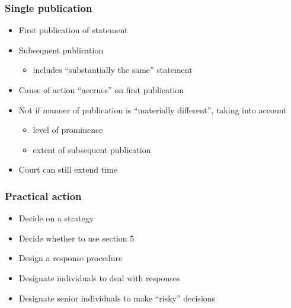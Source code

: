 \documentclass[ignorenonframetext,]{beamer}
\begin{document}
\begin{frame}
  \frametitle{Single publication}
  \begin{itemize}
  \item First publication of statement
  \item Subsequent publication
    \begin{itemize}
    \item includes ``substantially the same'' statement
    \end{itemize}
  \item Cause of action ``accrues'' on first publication
  \item Not if manner of publication is ``materially different'', taking into account
    \begin{itemize}
    \item level of prominence
    \item extent of subsequent publication
    \end{itemize}
  \item Court can still extend time
  \end{itemize}
\end{frame}

\begin{frame}
  \frametitle{Practical action}
  \begin{itemize}
  \item Decide on a strategy
  \item Decide whether to use section 5
  \item Design a response procedure
  \item Designate individuals to deal with responses
  \item Designate senior individuals to make ``risky'' decisions
  \end{itemize}
\end{frame}
\end{document}
